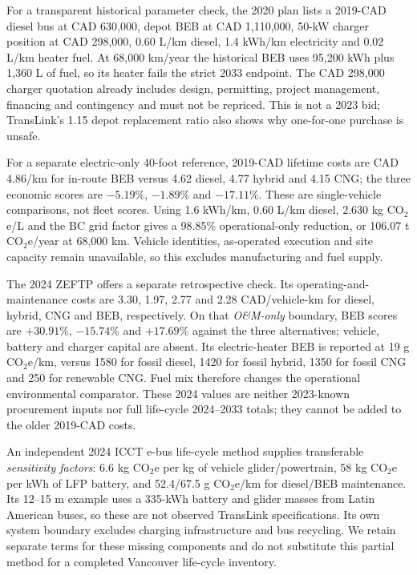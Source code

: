 \documentclass[12pt,letterpaper]{article}
\begin{document}
For a transparent historical parameter check, the 2020 plan lists a 2019-CAD diesel bus at CAD 630,000, depot BEB at CAD 1,110,000, 50-kW charger position at CAD 298,000, 0.60 L/km diesel, 1.4 kWh/km electricity and 0.02 L/km heater fuel.\cite{fleet2020} At 68,000 km/year the historical BEB uses 95,200 kWh plus 1,360 L of fuel, so its heater fails the strict 2033 endpoint. The CAD 298,000 charger quotation already includes design, permitting, project management, financing and contingency and must not be repriced. This is not a 2023 bid; TransLink's 1.15 depot replacement ratio also shows why one-for-one purchase is unsafe.

For a separate electric-only 40-foot reference, 2019-CAD lifetime costs are CAD 4.86/km for in-route BEB versus 4.62 diesel, 4.77 hybrid and 4.15 CNG; the three economic scores are $-5.19\%$, $-1.89\%$ and $-17.11\%$. These are single-vehicle comparisons, not fleet scores. Using 1.6 kWh/km, 0.60 L/km diesel, 2.630 kg CO$_2$e/L and the BC grid factor gives a 98.85\% operational-only reduction, or 106.07 t CO$_2$e/year at 68,000 km. Vehicle identities, as-operated execution and site capacity remain unavailable, so this excludes manufacturing and fuel supply.\cite{fleet2020,fleetupdate2020,ghgmodule,bcgrid}

The 2024 ZEFTP offers a separate retrospective check. Its operating-and-maintenance costs are 3.30, 1.97, 2.77 and 2.28 CAD/vehicle-km for diesel, hybrid, CNG and BEB, respectively. On that \emph{O\&M-only} boundary, BEB scores are $+30.91\%$, $-15.74\%$ and $+17.69\%$ against the three alternatives; vehicle, battery and charger capital are absent. Its electric-heater BEB is reported at 19 g CO$_2$e/km, versus 1580 for fossil diesel, 1420 for fossil hybrid, 1350 for fossil CNG and 250 for renewable CNG. Fuel mix therefore changes the operational environmental comparator. These 2024 values are neither 2023-known procurement inputs nor full life-cycle 2024--2033 totals; they cannot be added to the older 2019-CAD costs.\cite{playbook2024}

An independent 2024 ICCT e-bus life-cycle method supplies transferable \emph{sensitivity factors}: 6.6 kg CO$_2$e per kg of vehicle glider/powertrain, 58 kg CO$_2$e per kWh of LFP battery, and 52.4/67.5 g CO$_2$e/km for diesel/BEB maintenance. Its 12--15 m example uses a 335-kWh battery and glider masses from Latin American buses, so these are not observed TransLink specifications. Its own system boundary excludes charging infrastructure and bus recycling. We retain separate terms for these missing components and do not substitute this partial method for a completed Vancouver life-cycle inventory.\cite{icct2024}
\end{document}
